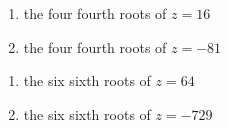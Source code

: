 \begin{multicols}{2} 

\begin{enumerate}

\setcounter{enumi}{\value{HW}}

\item  the four fourth roots of $z=16$
\item  the four fourth roots of $z=-81$

\setcounter{HW}{\value{enumi}}

\end{enumerate}

\end{multicols}

\begin{multicols}{2} 

\begin{enumerate}

\setcounter{enumi}{\value{HW}}

\item the six sixth roots of $z = 64$
\item the six sixth roots of $z = -729$ \label{polarrootslast}

\setcounter{HW}{\value{enumi}}

\end{enumerate}

\end{multicols}

